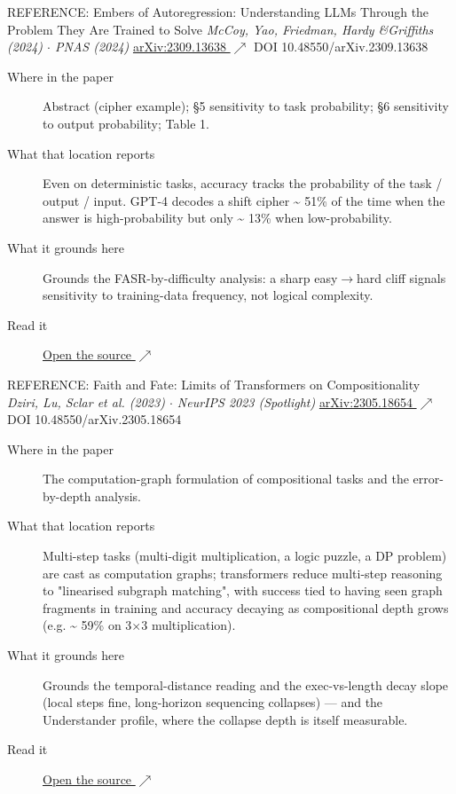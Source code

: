 \begin{bmmcard}{REFERENCE: Embers of Autoregression: Understanding LLMs Through the Problem They Are Trained to Solve}
\emph{McCoy, Yao, Friedman, Hardy \&Griffiths (2024) \(\cdot\) PNAS (2024)}
\href{https://arxiv.org/abs/2309.13638}{arXiv:2309.13638 \(\nearrow\)} DOI 10.48550/arXiv.2309.13638
\begin{description}
\item[Where in the paper] Abstract (cipher example); \S{}5 sensitivity to task probability; \S{}6 sensitivity to output probability; Table 1.
\item[What that location reports] Even on deterministic tasks, accuracy tracks the probability of the task / output / input. GPT-4 decodes a shift cipher \textasciitilde{} 51\% of the time when the answer is high-probability but only \textasciitilde{} 13\% when low-probability.
\item[What it grounds here] Grounds the FASR-by-difficulty analysis: a sharp easy\(\rightarrow\)hard cliff signals sensitivity to training-data frequency, not logical complexity.
\item[Read it] \href{https://arxiv.org/abs/2309.13638}{Open the source \(\nearrow\)}
\end{description}
\end{bmmcard}

\begin{bmmcard}{REFERENCE: Faith and Fate: Limits of Transformers on Compositionality}
\emph{Dziri, Lu, Sclar et al. (2023) \(\cdot\) NeurIPS 2023 (Spotlight)}
\href{https://arxiv.org/abs/2305.18654}{arXiv:2305.18654 \(\nearrow\)} DOI 10.48550/arXiv.2305.18654
\begin{description}
\item[Where in the paper] The computation-graph formulation of compositional tasks and the error-by-depth analysis.
\item[What that location reports] Multi-step tasks (multi-digit multiplication, a logic puzzle, a DP problem) are cast as computation graphs; transformers reduce multi-step reasoning to "linearised subgraph matching", with success tied to having seen graph fragments in training and accuracy decaying as compositional depth grows (e.g. \textasciitilde{} 59\% on 3\(\times\)3 multiplication).
\item[What it grounds here] Grounds the temporal-distance reading and the exec-vs-length decay slope (local steps fine, long-horizon sequencing collapses) --- and the Understander profile, where the collapse depth is itself measurable.
\item[Read it] \href{https://arxiv.org/abs/2305.18654}{Open the source \(\nearrow\)}
\end{description}
\end{bmmcard}


